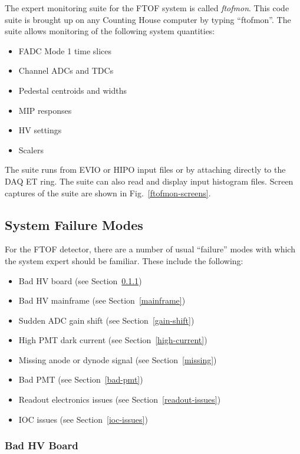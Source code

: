 \documentclass[12pt]{article}
\begin{document}
The expert monitoring suite for the FTOF system is called {\it ftofmon}. This code 
suite is brought up on any Counting House computer by typing ``ftofmon''. The suite
allows monitoring of the following system quantities:

\begin{itemize}
\item FADC Mode 1 time slices
\item Channel ADCs and TDCs
\item Pedestal centroids and widths
\item MIP responses
\item HV settings
\item Scalers
\end{itemize}

The suite runs from EVIO or HIPO input files or by attaching directly to the DAQ ET 
ring. The suite can also read and display input histogram files. Screen captures of 
the suite are shown in Fig.~\ref{ftofmon-screens}. 

\subsection{System Failure Modes}
\label{repairs}

For the FTOF detector, there are a number of usual ``failure'' modes with which the 
system expert should be familiar. These include the following:

\begin{itemize}
\item Bad HV board (see Section~\ref{board-swap})
\item Bad HV mainframe (see Section~\ref{mainframe})
\item Sudden ADC gain shift (see Section~\ref{gain-shift})
\item High PMT dark current (see Section~\ref{high-current})
\item Missing anode or dynode signal (see Section~\ref{missing})
\item Bad PMT (see Section~\ref{bad-pmt})
\item Readout electronics issues (see Section~\ref{readout-issues})
\item IOC issues (see Section~\ref{ioc-issues})
\end{itemize}

\subsubsection{Bad HV Board}
\label{board-swap}
\end{document}
